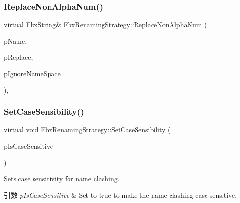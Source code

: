 \subsubsection{\texorpdfstring{Replace\+Non\+Alpha\+Num()}{ReplaceNonAlphaNum()}}
{\footnotesize\ttfamily virtual \hyperlink{class_fbx_string}{Fbx\+String}\& Fbx\+Renaming\+Strategy\+::\+Replace\+Non\+Alpha\+Num (\begin{DoxyParamCaption}\item[{\hyperlink{class_fbx_string}{Fbx\+String} \&}]{p\+Name,  }\item[{const char $\ast$}]{p\+Replace,  }\item[{bool}]{p\+Ignore\+Name\+Space }\end{DoxyParamCaption})\hspace{0.3cm}{\ttfamily [protected]}, {\ttfamily [virtual]}}

\mbox{\label{class_fbx_renaming_strategy_a4ffe010b34e4040da2525db5fcaa4f45}} 
\subsubsection{\texorpdfstring{Set\+Case\+Sensibility()}{SetCaseSensibility()}}
{\footnotesize\ttfamily virtual void Fbx\+Renaming\+Strategy\+::\+Set\+Case\+Sensibility (\begin{DoxyParamCaption}\item[{bool}]{p\+Is\+Case\+Sensitive }\end{DoxyParamCaption})\hspace{0.3cm}{\ttfamily [virtual]}}

Sets case sensitivity for name clashing. 
\begin{DoxyParams}{引数}
{\em p\+Is\+Case\+Sensitive} & Set to {\ttfamily true} to make the name clashing case sensitive. \\
\hline
\end{DoxyParams}
\mbox{\label{class_fbx_renaming_strategy_a71f4af04239a7d159f4f049080616356}} 
